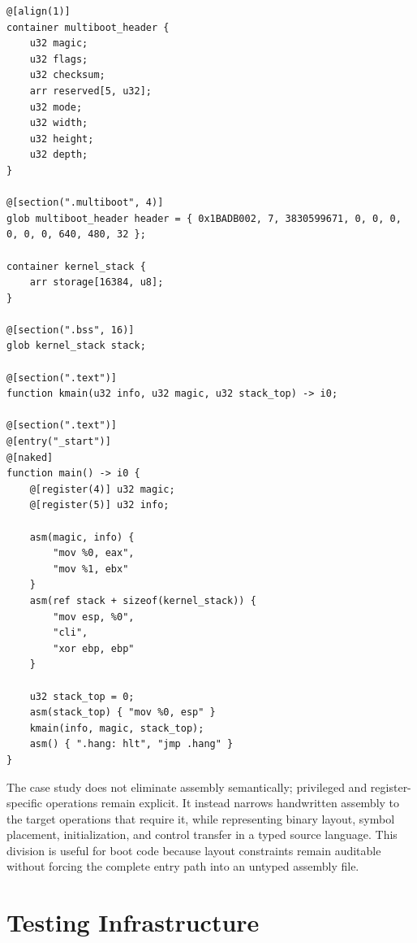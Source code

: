 \documentclass[10pt,twocolumn]{article}
\begin{document}
\begin{lstlisting}[language=APL,caption={Abridged Multiboot-compatible i386 entry unit.},label={lst:multiboot-apl},basicstyle=\ttfamily\tiny]
@[align(1)]
container multiboot_header {
    u32 magic;
    u32 flags;
    u32 checksum;
    arr reserved[5, u32];
    u32 mode;
    u32 width;
    u32 height;
    u32 depth;
}

@[section(".multiboot", 4)]
glob multiboot_header header = { 0x1BADB002, 7, 3830599671, 0, 0, 0, 0, 0, 0, 640, 480, 32 };

container kernel_stack {
    arr storage[16384, u8];
}

@[section(".bss", 16)]
glob kernel_stack stack;

@[section(".text")]
function kmain(u32 info, u32 magic, u32 stack_top) -> i0;

@[section(".text")]
@[entry("_start")]
@[naked]
function main() -> i0 {
    @[register(4)] u32 magic;
    @[register(5)] u32 info;

    asm(magic, info) {
        "mov %0, eax",
        "mov %1, ebx"
    }
    asm(ref stack + sizeof(kernel_stack)) {
        "mov esp, %0",
        "cli",
        "xor ebp, ebp"
    }

    u32 stack_top = 0;
    asm(stack_top) { "mov %0, esp" }
    kmain(info, magic, stack_top);
    asm() { ".hang: hlt", "jmp .hang" }
}
\end{lstlisting}

\par The case study does not eliminate assembly semantically; privileged and register-specific operations remain explicit. It instead narrows handwritten assembly to the target operations that require it, while representing binary layout, symbol placement, initialization, and control transfer in a typed source language. This division is useful for boot code because layout constraints remain auditable without forcing the complete entry path into an untyped assembly file.

\section{Testing Infrastructure}
\end{document}
